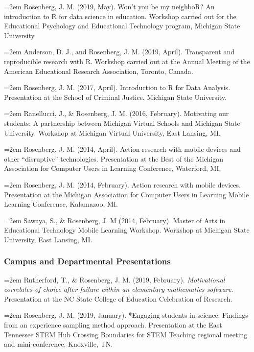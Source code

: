 \documentclass[14,]{article}
\begin{document}
\hangindent=2em Rosenberg, J. M. (2019, May). Won't you be my neighboR?
An introduction to R for data science in education. Workshop carried out
for the Educational Psychology and Educational Technology program,
Michigan State University.

\hangindent=2em Anderson, D. J., and Rosenberg, J. M. (2019, April).
Transparent and reproducible research with R. Workshop carried out at
the Annual Meeting of the American Educational Research Association,
Toronto, Canada.

\hangindent=2em Rosenberg, J. M. (2017, April). Introduction to R for
Data Analysis. Presentation at the School of Criminal Justice, Michigan
State University.

\hangindent=2em Ranellucci, J., \& Rosenberg, J. M. (2016, February).
Motivating our students: A partnership between Michigan Virtual Schools
and Michigan State University. Workshop at Michigan Virtual University,
East Lansing, MI.

\hangindent=2em Rosenberg, J. M. (2014, April). Action research with
mobile devices and other ``disruptive'' technologies. Presentation at
the Best of the Michigan Association for Computer Users in Learning
Conference, Waterford, MI.

\hangindent=2em Rosenberg, J. M. (2014, February). Action research with
mobile devices. Presentation at the Michigan Association for Computer
Users in Learning Mobile Learning Conference, Kalamazoo, MI.

\hangindent=2em Sawaya, S., \& Rosenberg, J. M (2014, February). Master
of Arts in Educational Technology Mobile Learning Workshop. Workshop at
Michigan State University, East Lansing, MI.

\hypertarget{campus-and-departmental-presentations}{%
\subsubsection{Campus and Departmental
Presentations}\label{campus-and-departmental-presentations}}

\hangindent=2em Rutherford, T., \& Rosenberg, J. M. (2019, February).
\emph{Motivational correlates of choice after failure within an
elementary mathematics software}. Presentation at the NC State College
of Education Celebration of Research.

\hangindent=2em Rosenberg, J. M. (2019, January). *Engaging students in
science: Findings from an experience sampling method approach.
Presentation at the East Tennessee STEM Hub Crossing Boundaries for STEM
Teaching regional meeting and mini-conference. Knoxville, TN.
\end{document}
